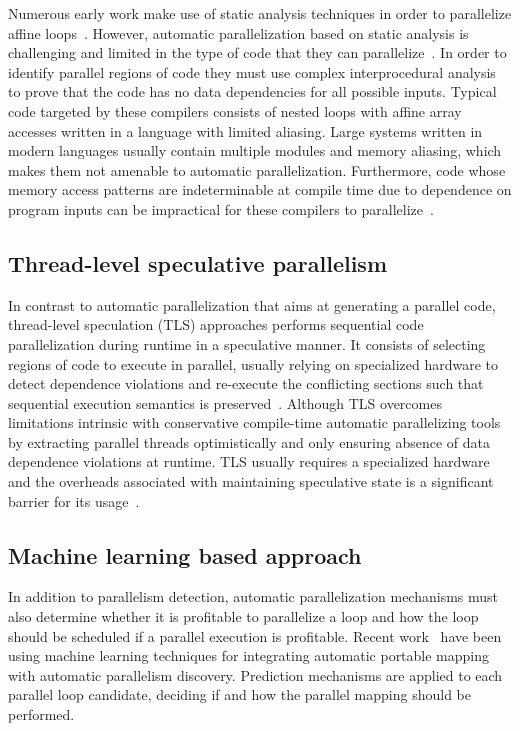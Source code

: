 \documentclass[a4paper,12pt]{article}
\begin{document}
Numerous early work make use of static analysis techniques in order to
parallelize affine
loops~\cite{kuck81,padua93,blume94,lim97,bondhugula08,misailovic13}.  However,
automatic parallelization based on static analysis is challenging and limited
in the type of code that they can
parallelize~\cite{bruening98,kennedy01,chen03}.  In order to identify parallel
regions of code they must use complex interprocedural analysis to prove that
the code has no data dependencies for all possible inputs.  Typical code
targeted by these compilers consists of nested loops with affine array accesses
written in a language with limited aliasing. Large systems written in modern
languages usually contain multiple modules and memory aliasing, which makes
them not amenable to automatic parallelization.  Furthermore, code whose memory
access patterns are indeterminable at compile time due to dependence on program
inputs can be impractical for these compilers to parallelize~\cite{bruening98}.

\subsection{Thread-level speculative parallelism}

In contrast to automatic parallelization that aims at generating a parallel
code, thread-level speculation (TLS) approaches performs sequential code
parallelization during runtime in a speculative manner.  It consists of
selecting regions of code to execute in parallel, usually relying on specialized
hardware to detect dependence violations and re-execute the conflicting
sections such that sequential execution semantics is
preserved~\cite{hammond98,chen03,wu08}.  Although TLS overcomes limitations
intrinsic with conservative compile-time automatic parallelizing tools by
extracting parallel threads optimistically and only ensuring absence of data
dependence violations at runtime. TLS usually requires a specialized hardware
and the overheads associated with maintaining speculative state is a
significant barrier for its usage~\cite{yiapanis13}.

\subsection{Machine learning based approach}

In addition to parallelism detection, automatic parallelization mechanisms must
also determine whether it is profitable to parallelize a loop and how the loop
should be scheduled if a parallel execution is profitable.  Recent
work~\cite{wang09,tournavitis09,wang14a} have been using machine learning
techniques for integrating automatic portable mapping with automatic
parallelism discovery.  Prediction mechanisms are applied to each parallel loop
candidate, deciding if and how the parallel mapping should be performed.
\end{document}
